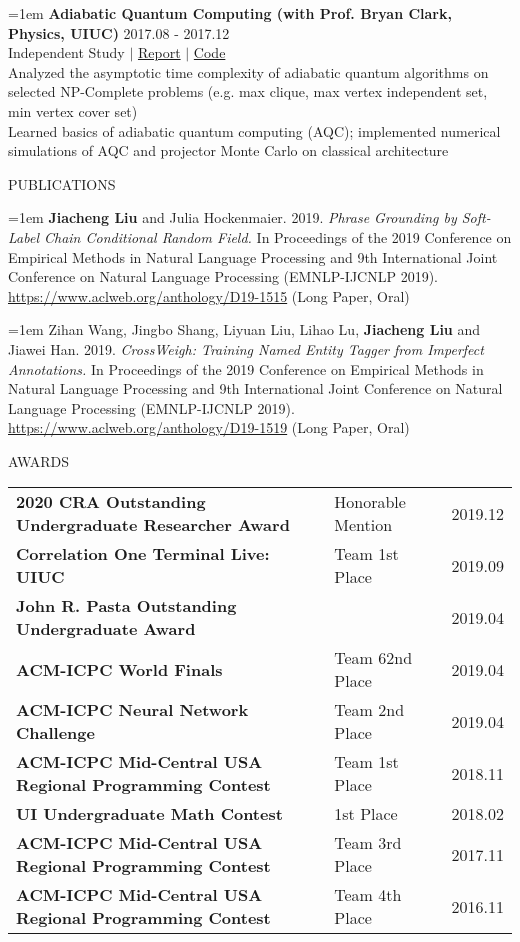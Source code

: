 \documentclass[10pt]{article}
\begin{document}
\hangindent=1em
\textbf{Adiabatic Quantum Computing (with Prof. Bryan Clark, Physics, UIUC)} \hfill 2017.08 - 2017.12 \\
Independent Study $|$ \href{https://github.com/liujch1998/AQC/blob/master/report/report.pdf}{Report} $|$ \href{https://github.com/liujch1998/AQC}{Code} \\
Analyzed the asymptotic time complexity of adiabatic quantum algorithms on selected NP-Complete problems (e.g. max clique, max vertex independent set, min vertex cover set) \\
Learned basics of adiabatic quantum computing (AQC); implemented numerical simulations of AQC and projector Monte Carlo on classical architecture

\vspace{1em}
{\LARGE PUBLICATIONS}

\hangindent=1em
\textbf{Jiacheng Liu} and Julia Hockenmaier. 2019. \emph{Phrase Grounding by Soft-Label Chain Conditional Random Field.} In Proceedings of the 2019 Conference on Empirical Methods in Natural Language Processing and 9th International Joint Conference on Natural Language Processing (EMNLP-IJCNLP 2019). \href{https://www.aclweb.org/anthology/D19-1515}{https://www.aclweb.org/anthology/D19-1515} (Long Paper, Oral)

\hangindent=1em
Zihan Wang, Jingbo Shang, Liyuan Liu, Lihao Lu, \textbf{Jiacheng Liu} and Jiawei Han. 2019. \emph{CrossWeigh: Training Named Entity Tagger from Imperfect Annotations.} In Proceedings of the 2019 Conference on Empirical Methods in Natural Language Processing and 9th International Joint Conference on Natural Language Processing (EMNLP-IJCNLP 2019). \href{https://www.aclweb.org/anthology/D19-1519}{https://www.aclweb.org/anthology/D19-1519} (Long Paper, Oral)

\newpage

\vspace{1em}
{\LARGE AWARDS}

\begin{tabularx}{\textwidth}{X l r}
\textbf{2020 CRA Outstanding Undergraduate Researcher Award} & Honorable Mention & 2019.12 \\
\textbf{Correlation One Terminal Live: UIUC} & Team 1st Place & 2019.09 \\
\textbf{John R. Pasta Outstanding Undergraduate Award} & & 2019.04 \\
\textbf{ACM-ICPC World Finals} & Team 62nd Place & 2019.04 \\
\textbf{ACM-ICPC Neural Network Challenge} & Team 2nd Place & 2019.04 \\
\textbf{ACM-ICPC Mid-Central USA Regional Programming Contest} & Team 1st Place & 2018.11 \\
\textbf{UI Undergraduate Math Contest} & 1st Place & 2018.02 \\
\textbf{ACM-ICPC Mid-Central USA Regional Programming Contest} & Team 3rd Place & 2017.11 \\
\textbf{ACM-ICPC Mid-Central USA Regional Programming Contest} & Team 4th Place & 2016.11
\end{tabularx}
\end{document}
